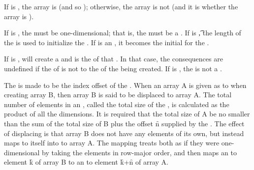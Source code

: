 If  is ,
the array is  
	      (and so );
otherwise, the array is not  
       (and it is  whether 
	    the array is ).

If  is ,
the  must be one-dimensional;
that is, the  must be a .
If  is \t,
the length of the  is used to initialize the .
If  is an ,
it becomes the initial  for the .

If  is ,
 will create a  
and  is the  of that . 
In that case, the consequences are undefined if the  of 
 is not  to the 
of the  being created.
If  is \nil, the  is not a .

The  is made to be the index offset of the .
When an array A is given as
 to  
when creating array B,
then array B is said to be displaced to array A.  The
total number of elements in an , 
called the total size of the ,
is calculated as the product of all the dimensions.
It is required that the total size of A be no smaller than the sum
of the total size of B plus the offset \f{n} supplied by
the .
The effect of displacing is that array B does not have any
elements of its own, but instead maps  to itself into
 to array A.  The mapping treats both  as if they
were one-dimensional by taking the elements in row-major order,
and then maps an  to element \f{k} of array B to an  to element
\f{k}+\f{n} of array A.

